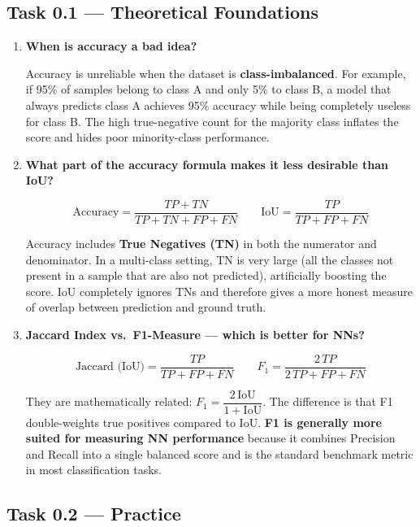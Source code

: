 \documentclass[12pt,a4paper]{article}
\begin{document}
\subsection{Task 0.1 — Theoretical Foundations}

\begin{enumerate}[leftmargin=*, label=\textbf{\arabic*.}]

\item \textbf{When is accuracy a bad idea?}

    Accuracy is unreliable when the dataset is \textbf{class-imbalanced}.
    For example, if 95\% of samples belong to class A and only 5\% to class B,
    a model that always predicts class A achieves 95\% accuracy while being
    completely useless for class B.  The high true-negative count for the
    majority class inflates the score and hides poor minority-class performance.

\item \textbf{What part of the accuracy formula makes it less desirable than IoU?}

    \[
    \text{Accuracy} = \frac{TP + TN}{TP + TN + FP + FN}
    \qquad
    \text{IoU} = \frac{TP}{TP + FP + FN}
    \]

    Accuracy includes \textbf{True Negatives (TN)} in both the numerator and
    denominator.  In a multi-class setting, TN is very large (all the classes
    not present in a sample that are also not predicted), artificially boosting
    the score.  IoU completely ignores TNs and therefore gives a more honest
    measure of overlap between prediction and ground truth.

\item \textbf{Jaccard Index vs.\ F1-Measure — which is better for NNs?}

    \[
    \text{Jaccard (IoU)} = \frac{TP}{TP + FP + FN}
    \qquad
    F_1 = \frac{2\,TP}{2\,TP + FP + FN}
    \]

    They are mathematically related: $F_1 = \dfrac{2\,\text{IoU}}{1 + \text{IoU}}$.
    The difference is that F1 double-weights true positives compared to IoU.
    \textbf{F1 is generally more suited for measuring NN performance} because it
    combines Precision and Recall into a single balanced score and is the
    standard benchmark metric in most classification tasks.

\end{enumerate}

\subsection{Task 0.2 — Practice}
\end{document}
